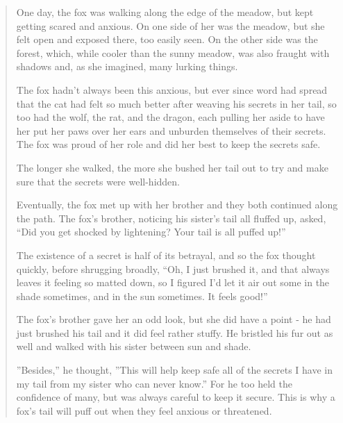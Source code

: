 \begin{quotation}
One day, the fox was walking along the edge of the meadow, but kept getting scared and anxious. On one side of her was the meadow, but she felt open and exposed there, too easily seen. On the other side was the forest, which, while cooler than the sunny meadow, was also fraught with shadows and, as she imagined, many lurking things.

The fox hadn't always been this anxious, but ever since word had spread that the cat had felt so much better after weaving his secrets in her tail, so too had the wolf, the rat, and the dragon, each pulling her aside to have her put her paws over her ears and unburden themselves of their secrets. The fox was proud of her role and did her best to keep the secrets safe.

The longer she walked, the more she bushed her tail out to try and make sure that the secrets were well-hidden.

Eventually, the fox met up with her brother and they both continued along the path. The fox's brother, noticing his sister's tail all fluffed up, asked, ``Did you get shocked by lightening? Your tail is all puffed up!''

The existence of a secret is half of its betrayal, and so the fox thought quickly, before shrugging broadly, ``Oh, I just brushed it, and that always leaves it feeling so matted down, so I figured I'd let it air out some in the shade sometimes, and in the sun sometimes. It feels good!''

The fox's brother gave her an odd look, but she did have a point - he had just brushed his tail and it did feel rather stuffy. He bristled his fur out as well and walked with his sister between sun and shade.

''Besides,'' he thought, ''This will help keep safe all of the secrets I have in my tail from my sister who can never know.'' For he too held the confidence of many, but was always careful to keep it secure. This is why a fox's tail will puff out when they feel anxious or threatened.
\end{quotation}
